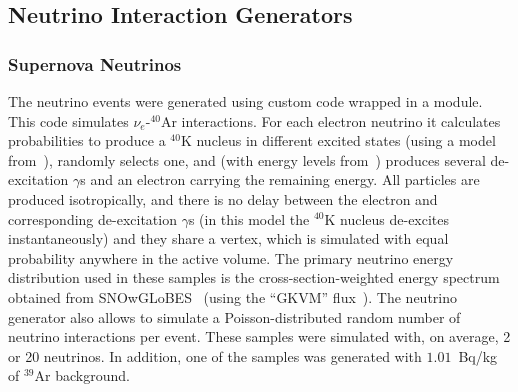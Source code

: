


\subsection{Neutrino Interaction Generators} 
\label{sec:tools-mc-gen}




\subsubsection{Supernova Neutrinos}

The  neutrino events were generated using custom code wrapped in a  module.
This code simulates  $\nu_e$-$^{40}$Ar interactions.
For each electron neutrino it calculates probabilities to produce a $^{40}$K nucleus
in different excited states (using a model from~\cite{Bhattacharya:1998hc}),
randomly selects one, and (with energy levels from~\cite{Cameron:2004myb}) 
produces several de-excitation $\gamma$s and an electron carrying the remaining energy.
All particles are produced isotropically, and 
there is no delay between the electron and corresponding de-excitation $\gamma$s
(in this model the $^{40}$K nucleus de-excites instantaneously) and they share a vertex,
which is simulated with equal probability anywhere in the active volume.
The primary neutrino energy distribution used in these samples is the cross-section-weighted 
energy spectrum obtained from SNOwGLoBES~\cite{snowglobes} (using the ``GKVM'' flux~\cite{GKVM}).
The  neutrino generator also allows to simulate a Poisson-distributed random number 
of neutrino interactions per event. These samples were simulated with, on average, 2 or 20 neutrinos.
In addition, one of the samples was generated with $1.01$~Bq/kg of $^{39}$Ar background.

